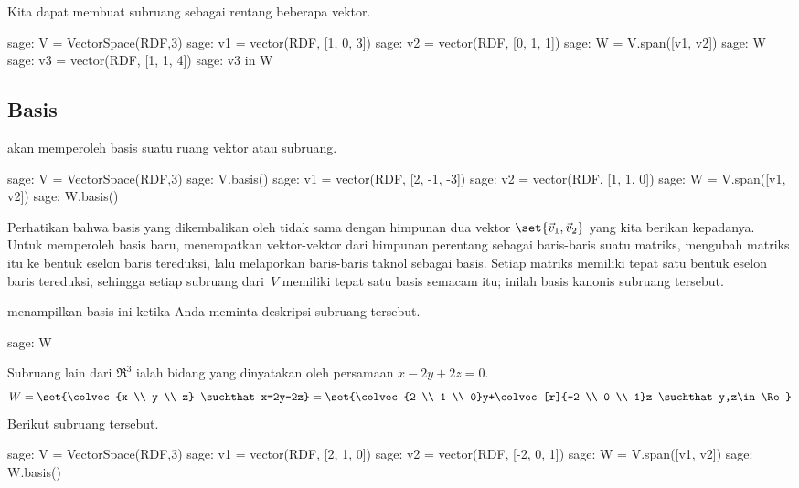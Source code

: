 Kita dapat membuat subruang sebagai rentang beberapa vektor.
\begin{sagecommandline}
sage: V = VectorSpace(RDF,3)
sage: v1 = vector(RDF, [1, 0, 3])
sage: v2 = vector(RDF, [0, 1, 1])
sage: W = V.span([v1, v2])
sage: W
sage: v3 = vector(RDF, [1, 1, 4])
sage: v3 in W
\end{sagecommandline}



\subsection{Basis}
\Sage{} akan memperoleh basis suatu ruang vektor atau subruang.
\begin{sagecommandline}
sage: V = VectorSpace(RDF,3)
sage: V.basis()
sage: v1 = vector(RDF, [2, -1, -3])
sage: v2 = vector(RDF, [1, 1, 0])
sage: W = V.span([v1, v2])     
sage: W.basis()
\end{sagecommandline}
Perhatikan bahwa basis yang dikembalikan oleh \Sage{}  
tidak sama dengan himpunan dua vektor
$\set{\vec{v}_1, \vec{v}_2}$ yang kita berikan kepadanya.
Untuk memperoleh basis baru, \Sage{} menempatkan vektor-vektor dari himpunan perentang 
sebagai baris-baris suatu matriks,
mengubah matriks itu ke bentuk eselon baris tereduksi, lalu melaporkan baris-baris 
taknol sebagai basis.
Setiap matriks memiliki tepat satu bentuk eselon baris tereduksi, sehingga setiap 
subruang dari~$V$ memiliki tepat satu basis semacam itu;
inilah basis kanonis subruang tersebut.

\Sage{} menampilkan basis ini ketika Anda meminta deskripsi
subruang tersebut.
\begin{sagecommandline}
sage: W  
\end{sagecommandline}

Subruang lain dari $\Re^3$ ialah bidang yang dinyatakan oleh persamaan
$x-2y+2z=0$.
\begin{equation*}
  W=\set{\colvec{x \\ y \\ z}
    \suchthat x=2y-2z}
  =\set{\colvec{2 \\ 1 \\ 0}y+\colvec[r]{-2 \\ 0 \\ 1}z
        \suchthat y,z\in\Re}
\end{equation*}
Berikut subruang tersebut.
\begin{sagecommandline}
sage: V = VectorSpace(RDF,3)               
sage: v1 = vector(RDF, [2, 1, 0]) 
sage: v2 = vector(RDF, [-2, 0, 1]) 
sage: W = V.span([v1, v2])       
sage: W.basis()
\end{sagecommandline}

